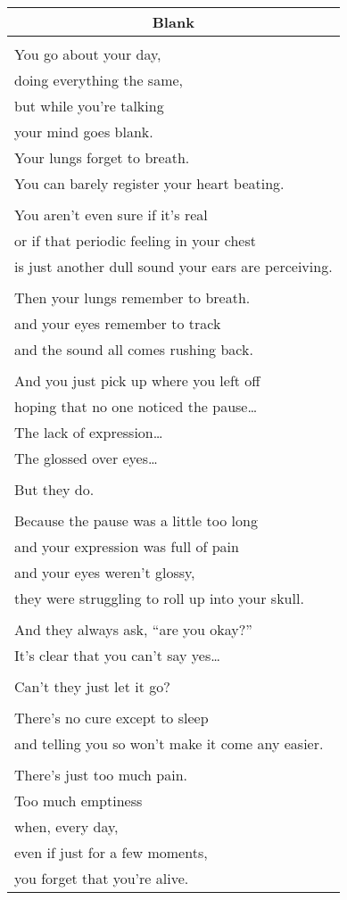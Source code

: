 \documentclass{article}
\begin{document}
\begin{center}
\begin{tabular}{l}
\multicolumn{1}{c}{\textbf{Blank}} \\ \hline
\\
You go about your day, \\
doing everything the same, \\
but while you're talking \\
your mind goes blank. \\
Your lungs forget to breath. \\
You can barely register your heart beating. \\
\\
You aren't even sure if it's real \\
or if that periodic feeling in your chest \\
is just another dull sound your ears are perceiving. \\
\\
Then your lungs remember to breath. \\
and your eyes remember to track \\
and the sound all comes rushing back. \\
\\
And you just pick up where you left off \\
hoping that no one noticed the pause\ldots{} \\
The lack of expression\ldots{} \\
The glossed over eyes\ldots{} \\
\\
But they do. \\
\\
Because the pause was a little too long \\
and your expression was full of pain \\
and your eyes weren't glossy, \\
they were struggling to roll up into your skull. \\
\\
And they always ask, ``are you okay?'' \\
It's clear that you can't say yes\ldots{} \\
\\
Can't they just let it go? \\
\\
There's no cure except to sleep \\
and telling you so won't make it come any easier. \\
\\
There's just too much pain. \\
Too much emptiness \\
when, every day, \\
even if just for a few moments, \\
you forget that you're alive. \\
\end{tabular}
\end{center}
\end{document}
